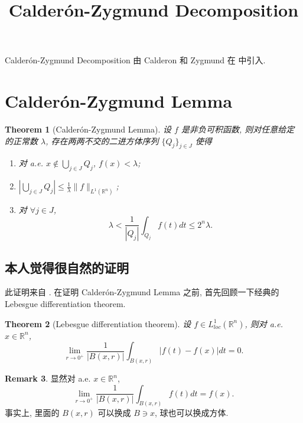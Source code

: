 \documentclass[a4paper,11pt]{article}
\title{Calder\'on-Zygmund Decomposition}
\newtheorem{theorem}{Theorem}[section]
\theoremstyle{definition}
\newtheorem{remark}[theorem]{Remark}
\begin{document}
\begin{CJK*}{UTF8}{gbsn}

\maketitle

Calder\'on-Zygmund Decomposition 由 Calderon 和 Zygmund 在 \cite{cz52} 中引入.

\section{Calder\'on-Zygmund Lemma}

\begin{theorem}[Calder\'on-Zygmund Lemma] \label{C-Z lemma}
    设 $ f $ 是非负可积函数, 则对任意给定的正常数 $ \lambda $, 存在两两不交的二进方体序列 $ \{Q_j\}_{j \in J} $ 
    使得
    \begin{enumerate}[{\rm(i)}]
        \item 对 a.e. $ x \notin \bigcup_{j \in J} Q_j $, $ f(x) < \lambda $;
        \item $ | \bigcup_{j \in J} Q_j | \leq \frac{1}{\lambda} \| f \|_{L^1(\mathbb{R}^n)} $;
        \item 对 $ \forall j \in J $, 
            $$
                \lambda < \frac{1}{|Q_j|} \int_{Q_j} f(t) dt \leq 2^n \lambda.
            $$
    \end{enumerate}
\end{theorem}

\subsection{本人觉得很自然的证明}

此证明来自 \cite[Lemma 1.2]{kk13}. 
在证明 Calder\'on-Zygmund Lemma 之前, 首先回顾一下经典的 Lebesgue differentiation theorem.

\begin{theorem}[Lebesgue differentiation theorem]
    设 $ f \in L^1_{loc}(\mathbb{R}^n) $, 则对 a.e. $ x \in \mathbb{R}^n $, 
    $$
        \lim_{r \to 0^+} \frac{1}{|B(x, r)|} \int_{B(x, r)} |f(t) - f(x)| dt = 0.
    $$
\end{theorem}

\begin{remark}
    显然对 a.e. $ x \in \mathbb{R}^n $,
    $$
        \lim_{r \to 0^+} \frac{1}{|B(x, r)|} \int_{B(x, r)} f(t) dt = f(x).
    $$
    事实上, 里面的 $ B(x, r) $ 可以换成 $ B \ni x $, 球也可以换成方体.
\end{remark}


\end{CJK*}
\end{document}
